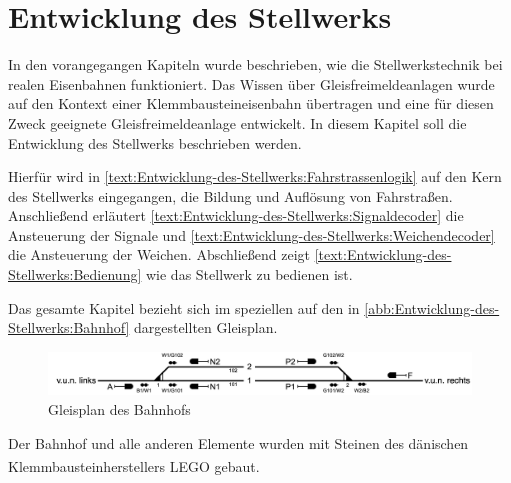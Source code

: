 \chapter{Entwicklung des Stellwerks}\label{text:Entwicklung-des-Stellwerks}

In den vorangegangen Kapiteln wurde beschrieben, wie die Stellwerkstechnik bei realen Eisenbahnen funktioniert. Das Wissen über Gleisfreimeldeanlagen wurde auf den Kontext einer Klemmbausteineisenbahn übertragen und eine für diesen Zweck geeignete Gleisfreimeldeanlage entwickelt. In diesem Kapitel soll die Entwicklung des Stellwerks beschrieben werden.

Hierfür wird in \autoref{text:Entwicklung-des-Stellwerks:Fahrstrassenlogik}  auf den Kern des Stellwerks eingegangen, die Bildung und Auflösung von Fahrstraßen. Anschließend erläutert \autoref{text:Entwicklung-des-Stellwerks:Signaldecoder}  die Ansteuerung der Signale und \autoref{text:Entwicklung-des-Stellwerks:Weichendecoder}  die Ansteuerung der Weichen. Abschließend zeigt \autoref{text:Entwicklung-des-Stellwerks:Bedienung}  wie das Stellwerk zu bedienen ist.

Das gesamte Kapitel bezieht sich im speziellen auf den in \autoref{abb:Entwicklung-des-Stellwerks:Bahnhof} dargestellten Gleisplan.

\begin{figure}[H]
    \centering
    \includegraphics[width=\textwidth]{Assets/Images/5-Entwicklung-des-Stellwerks/Bahnhof.png}
    \caption{Gleisplan des Bahnhofs}\label{abb:Entwicklung-des-Stellwerks:Bahnhof}
\end{figure}

Der Bahnhof und alle anderen Elemente wurden mit Steinen des dänischen Klemmbausteinherstellers LEGO\textsuperscript{\tiny{\textregistered}} gebaut.

\newpage


\newpage


\newpage


\newpage

